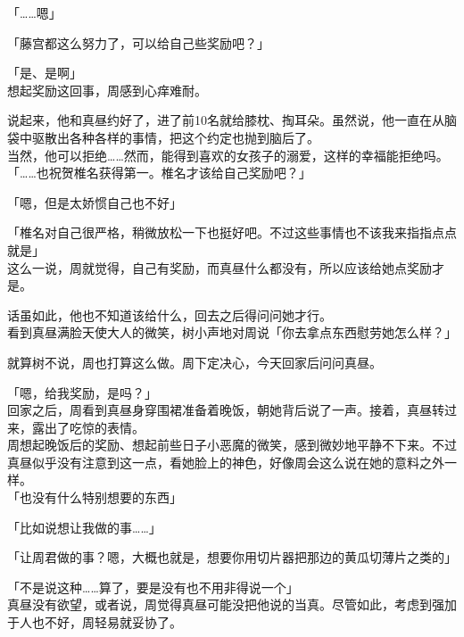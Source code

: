 「……嗯」

「藤宫都这么努力了，可以给自己些奖励吧？」

「是、是啊」\\

想起奖励这回事，周感到心痒难耐。

说起来，他和真昼约好了，进了前10名就给膝枕、掏耳朵。虽然说，他一直在从脑袋中驱散出各种各样的事情，把这个约定也抛到脑后了。\\

当然，他可以拒绝……然而，能得到喜欢的女孩子的溺爱，这样的幸福能拒绝吗。\\

「……也祝贺椎名获得第一。椎名才该给自己奖励吧？」

「嗯，但是太娇惯自己也不好」

「椎名对自己很严格，稍微放松一下也挺好吧。不过这些事情也不该我来指指点点就是」\\

这么一说，周就觉得，自己有奖励，而真昼什么都没有，所以应该给她点奖励才是。

话虽如此，他也不知道该给什么，回去之后得问问她才行。\\

看到真昼满脸天使大人的微笑，树小声地对周说「你去拿点东西慰劳她怎么样？」

就算树不说，周也打算这么做。周下定决心，今天回家后问问真昼。\\

\vspace{2\baselineskip}

「嗯，给我奖励，是吗？」\\

回家之后，周看到真昼身穿围裙准备着晚饭，朝她背后说了一声。接着，真昼转过来，露出了吃惊的表情。\\

周想起晚饭后的奖励、想起前些日子小恶魔的微笑，感到微妙地平静不下来。不过真昼似乎没有注意到这一点，看她脸上的神色，好像周会这么说在她的意料之外一样。\\

「也没有什么特别想要的东西」

「比如说想让我做的事……」

「让周君做的事？嗯，大概也就是，想要你用切片器把那边的黄瓜切薄片之类的」

「不是说这种……算了，要是没有也不用非得说一个」\\

真昼没有欲望，或者说，周觉得真昼可能没把他说的当真。尽管如此，考虑到强加于人也不好，周轻易就妥协了。\\

